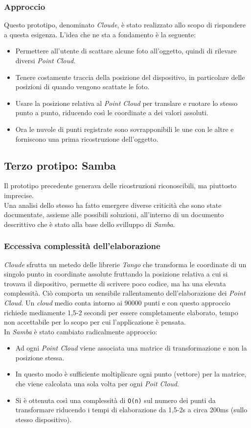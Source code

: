 \subsubsection{Approccio}
Questo prototipo, denominato \emph{Cloude}, è stato realizzato allo scopo di rispondere a questa esigenza. L'idea che ne sta a fondamento è la seguente:
\begin{itemize}
	\item Permettere all'utente di scattare alcune foto all'oggetto, quindi di rilevare diversi \emph{Point Cloud}.
	\item Tenere costamente traccia della posizione del dispositivo, in particolare delle posizioni di quando vengono scattate le foto.
	\item Usare la posizione relativa al \emph{Point Cloud} per translare e ruotare lo stesso punto a punto, riducendo così le coordinate a dei valori assoluti.
	\item Ora le nuvole di punti registrate sono sovrapponibili le une con le altre e forniscono una prima ricostruzione dell'oggetto.
\end{itemize}

\subsection{Terzo protipo: Samba}
Il prototipo precedente generava delle ricostruzioni riconoscibili, ma piuttosto imprecise.\\
Una analisi dello stesso ha fatto emergere diverse criticità che sono state documentate, assieme alle possibili soluzioni, all'interno di un documento descrittivo che è stato alla base dello svilluppo di \emph{Samba}.
\subsubsection{Eccessiva complessità dell'elaborazione}
\emph{Cloude} sfrutta un metedo delle librerie \emph{Tango} che transforma le coordinate di un singolo punto in coordinate assolute fruttando la posizione relativa a cui si trovava il dispositivo, permette di scrivere poco codice, ma ha una elevata complessità. Ciò comporta un sensibile rallentamento dell'elaborazione dei \emph{Point Cloud}. Un \emph{cloud} medio conta intorno ai 90000 punti e con questo approccio richiede mediamente 1,5-2 secondi per essere completamente elaborato, tempo non accettabile per lo scopo per cui l'applicazione è pensata.\\
In \emph{Samba} è stato cambiato radicalmente approccio:
\begin{itemize}
	\item Ad ogni \emph{Point Cloud} viene associata una matrice di transformazione e non la posizione stessa.
	\item In questo modo è sufficiente moltiplicare ogni punto (vettore) per la matrice, che viene calcolata una sola volta per ogni \emph{Poit Cloud}. 
	\item Si è ottenuta così una complessità di \texttt{O(n)} sul numero dei punti da transformare riducendo i tempi di elaborazione da 1,5-2s a circa 200ms (sullo stesso dispositivo).
\end{itemize}
